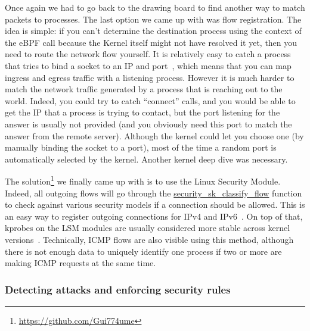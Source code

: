 Once again we had to go back to the drawing board to find another way to match packets to processes. The last option we came up with was flow registration. The idea is simple: if you can’t determine the destination process using the context of the eBPF call because the Kernel itself might not have resolved it yet, then you need to route the network flow yourself. It is relatively easy to catch a process that tries to bind a socket to an IP and port~\cite{ProcessLevelNetworkSecurityMonitoring:BrendanGregg}, which means that you can map ingress and egress traffic with a listening process. However it is much harder to match the network traffic generated by a process that is reaching out to the world. Indeed, you could try to catch “connect” calls, and you would be able to get the IP that a process is trying to contact, but the port listening for the answer is usually not provided (and you obviously need this port to match the answer from the remote server). Although the kernel could let you choose one (by manually binding the socket to a port), most of the time a random port is automatically selected by the kernel. Another kernel deep dive was necessary.

The solution\footnote{\url{https://github.com/Gui774ume}} we finally came up with is to use the Linux Security Module. Indeed, all outgoing flows will go through the \url{security_sk_classify_flow} function to check against various security models if a connection should be allowed. This is an easy way to register outgoing connections for IPv4 and IPv6~\cite{ProcessLevelNetworkSecurityMonitoring:RamiRosen}. On top of that, kprobes on the LSM modules are usually considered more stable across kernel versions~\cite{ProcessLevelNetworkSecurityMonitoring:BrendanGregg}. Technically, ICMP flows are also visible using this method, although there is not enough data to uniquely identify one process if two or more are making ICMP requests at the same time.

\subsubsection{Detecting attacks and enforcing security rules}

